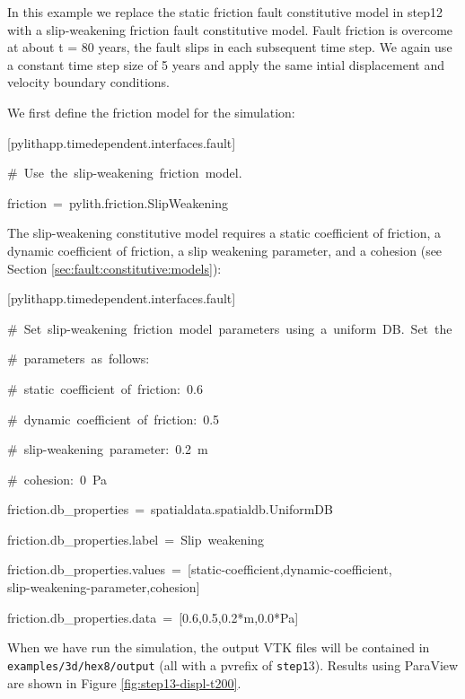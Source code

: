 In this example we replace the static friction fault constitutive
model in step12 with a slip-weakening friction fault constitutive
model. Fault friction is overcome at about t = 80 years, the fault
slips in each subsequent time step. We again use a constant time step
size of 5 years and apply the same intial displacement and velocity
boundary conditions.

We first define the friction model for the simulation:
\begin{lyxcode}
{[}pylithapp.timedependent.interfaces.fault{]}

\#~Use~the~slip-weakening~friction~model.

friction~=~pylith.friction.SlipWeakening
\end{lyxcode}
The slip-weakening constitutive model requires a static coefficient
of friction, a dynamic coefficient of friction, a slip weakening parameter,
and a cohesion (see Section \vref{sec:fault:constitutive:models}):
\begin{lyxcode}
{[}pylithapp.timedependent.interfaces.fault{]}

\#~Set~slip-weakening~friction~model~parameters~using~a~uniform~DB.~Set~the

\#~parameters~as~follows:

\#~static~coefficient~of~friction:~0.6

\#~dynamic~coefficient~of~friction:~0.5

\#~slip-weakening~parameter:~0.2~m

\#~cohesion:~0~Pa

friction.db\_properties~=~spatialdata.spatialdb.UniformDB

friction.db\_properties.label~=~Slip~weakening

friction.db\_properties.values~=~{[}static-coefficient,dynamic-coefficient,~\\
slip-weakening-parameter,cohesion{]}

friction.db\_properties.data~=~{[}0.6,0.5,0.2{*}m,0.0{*}Pa{]}
\end{lyxcode}
When we have run the simulation, the output VTK files will be contained
in \texttt{examples/3d/hex8/output} (all with a pvrefix of \texttt{step1}3).
Results using ParaView are shown in Figure \vref{fig:step13-displ-t200}.

